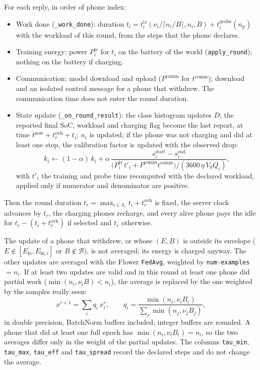 \documentclass[11pt,a4paper]{article}
\newcommand{\cf}[1]{\texttt{#1}}
\begin{document}
For each reply, in order of phone index:
\begin{itemize}
  \item Work done (\cf{\_work\_done}): duration $t_i = t^{\mathrm{tr}}_i(\nu_i /
        \lceil n_i/B \rceil, n_i, B) + t^{\mathrm{probe}}_i(n_{\mathrm{p}})$ with
        the workload of this round, from the steps that the phone declares.
  \item Training energy: power $P^{\mathrm{tr}}_i$ for $t_i$ on the battery of
        the world (\cf{apply\_round}); nothing on the battery if charging.
  \item Communication: model download and upload ($P^{\mathrm{comm}}$ for
        $t^{\mathrm{comm}}$); download and an isolated control message for a
        phone that withdrew. The communication time does not enter the round
        duration.
  \item State update (\cf{\_on\_round\_result}): the class histogram updates
        $D$; the reported final SoC, workload and charging flag become the last
        report, at time $t^{\mathrm{now}} + t^{\mathrm{ovh}}_r + t_i$; $n_i$ is
        updated; if the phone was not charging and did at least one step, the
        calibration factor is updated with the observed drop:
        \begin{equation}
          k_i \leftarrow (1 - \alpha)\, k_i + \alpha \, \frac{s^{\mathrm{start}}_i - s^{\mathrm{end}}_i}
          {\bigl(P^{\mathrm{tr}}_i\, t'_i + P^{\mathrm{comm}} t^{\mathrm{comm}}\bigr) / (3600\, \eta\, V_0 Q_i)} ,
        \end{equation}
        with $t'_i$ the training and probe time recomputed with the declared
        workload, applied only if numerator and denominator are positive.
\end{itemize}
Then the round duration $t_r = \max_{i \in S_r} t_i + t^{\mathrm{ovh}}_r$ is
fixed, the server clock advances by $t_r$, the charging phones recharge, and
every alive phone pays the idle for $t_r - (t_i + t^{\mathrm{ovh}}_r)$ if
selected and $t_r$ otherwise.

The update of a phone that withdrew, or whose $(E, B)$ is outside its envelope
($E \notin [E_{\mathrm{lo}}, E_{\mathrm{hi},i}]$ or $B \notin \mathcal{B}$), is
not averaged; its energy is charged anyway. The other updates are averaged with
the Flower \cf{FedAvg}, weighted by \cf{num-examples} $= n_i$. If at least two
updates are valid and in this round at least one phone did partial work
($\min(n_i, \nu_i B) < n_i$), the average is replaced by the one weighted by
the samples really seen:
\begin{equation}
  x^{r+1} = \sum_{i} q_i \, x^{r}_i , \qquad
  q_i = \frac{\min(n_i, \nu_i B_i)}{\sum_j \min(n_j, \nu_j B_j)} ,
\end{equation}
in double precision, BatchNorm buffers included; integer buffers are rounded.
A phone that did at least one full epoch has $\min(n_i, \nu_i B_i) = n_i$, so
the two averages differ only in the weight of the partial updates. The columns
\cf{tau\_min}, \cf{tau\_max}, \cf{tau\_eff} and \cf{tau\_spread} record the
declared steps and do not change the average.
\end{document}
